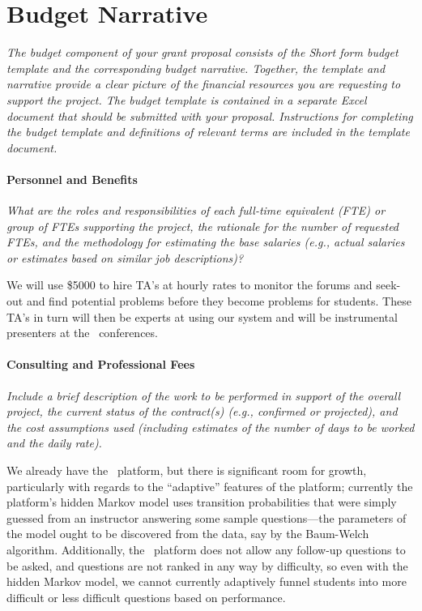 \section*{Budget Narrative}

\textsl{The budget component of your grant proposal consists of the
  Short form budget template and the corresponding budget
  narrative. Together, the template and narrative provide a clear
  picture of the financial resources you are requesting to support the
  project. The budget template is contained in a separate Excel
  document that should be submitted with your proposal. Instructions
  for completing the budget template and definitions of relevant terms
  are included in the template document.}

\paragraph{Personnel and Benefits} 
\textsl{What are the roles and responsibilities of each full-time
  equivalent (FTE) or group of FTEs supporting the project, the
  rationale for the number of requested FTEs, and the methodology for
  estimating the base salaries (e.g., actual salaries or estimates
  based on similar job descriptions)?}

\vspace{\topsep}

We will use \$5000 to hire TA's at hourly rates to monitor the
forums and seek-out and find potential problems before they become
problems for students. These TA's in turn will then be experts at
using our system and will be instrumental presenters at the
\mooculus\ conferences.


\paragraph{Consulting and Professional Fees}
\textsl{Include a brief description of the work to be performed in
  support of the overall project, the current status of the
  contract(s) (e.g., confirmed or projected), and the cost assumptions
  used (including estimates of the number of days to be worked and the
  daily rate).}

We already have the \mooculus\ platform, but there is significant room
for growth, particularly with regards to the ``adaptive'' features of
the platform; currently the platform's hidden Markov model uses
transition probabilities that were simply guessed from an instructor
answering some sample questions---the parameters of the model ought to
be discovered from the data, say by the Baum-Welch algorithm.
Additionally, the \mooculus\ platform does not allow any follow-up
questions to be asked, and questions are not ranked in any way by
difficulty, so even with the hidden Markov model, we cannot currently
adaptively funnel students into more difficult or less difficult
questions based on performance.

